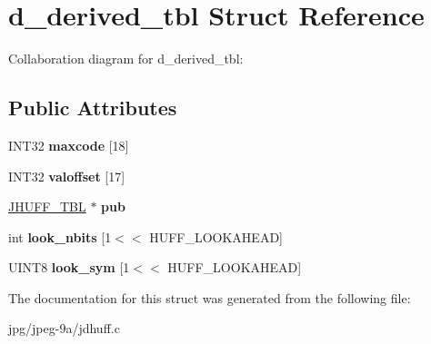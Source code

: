 \hypertarget{structd__derived__tbl}{\section{d\+\_\+derived\+\_\+tbl Struct Reference}
\label{structd__derived__tbl}
}


Collaboration diagram for d\+\_\+derived\+\_\+tbl\+:
\subsection*{Public Attributes}
\begin{DoxyCompactItemize}
\item 
\hypertarget{structd__derived__tbl_a4e226d20d913f1c516bd98a930008ad1}{I\+N\+T32 {\bfseries maxcode} \mbox{[}18\mbox{]}}\label{structd__derived__tbl_a4e226d20d913f1c516bd98a930008ad1}

\item 
\hypertarget{structd__derived__tbl_a67397b3869145321a25d2df17a0c11ec}{I\+N\+T32 {\bfseries valoffset} \mbox{[}17\mbox{]}}\label{structd__derived__tbl_a67397b3869145321a25d2df17a0c11ec}

\item 
\hypertarget{structd__derived__tbl_a816f4c07d3173cd1a96ef146acabf6c6}{\hyperlink{struct_j_h_u_f_f___t_b_l}{J\+H\+U\+F\+F\+\_\+\+T\+B\+L} $\ast$ {\bfseries pub}}\label{structd__derived__tbl_a816f4c07d3173cd1a96ef146acabf6c6}

\item 
\hypertarget{structd__derived__tbl_a69e9228ebe44420f896c147bcb8b2f4b}{int {\bfseries look\+\_\+nbits} \mbox{[}1$<$$<$ H\+U\+F\+F\+\_\+\+L\+O\+O\+K\+A\+H\+E\+A\+D\mbox{]}}\label{structd__derived__tbl_a69e9228ebe44420f896c147bcb8b2f4b}

\item 
\hypertarget{structd__derived__tbl_a526051256461864bc8395d1f6d1a82fd}{U\+I\+N\+T8 {\bfseries look\+\_\+sym} \mbox{[}1$<$$<$ H\+U\+F\+F\+\_\+\+L\+O\+O\+K\+A\+H\+E\+A\+D\mbox{]}}\label{structd__derived__tbl_a526051256461864bc8395d1f6d1a82fd}

\end{DoxyCompactItemize}


The documentation for this struct was generated from the following file\+:\begin{DoxyCompactItemize}
\item 
jpg/jpeg-\/9a/jdhuff.\+c\end{DoxyCompactItemize}
